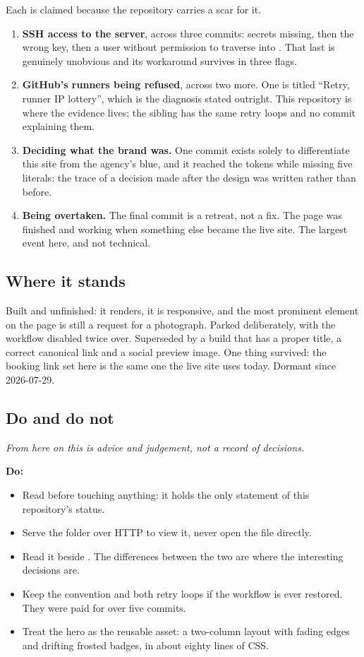 \documentclass[11pt,a4paper]{article}
\begin{document}
Each is claimed because the repository carries a scar for it.

\begin{enumerate}
\item \textbf{SSH access to the server}, across three commits: secrets missing, then
  the wrong key, then a  user without permission to traverse into
  . That last is genuinely unobvious and its workaround survives in
  three  flags.
\item \textbf{GitHub's runners being refused}, across two more. One is titled
  ``Retry, runner IP lottery'', which is the diagnosis stated outright. This
  repository is where the evidence lives; the sibling has the same retry loops and
  no commit explaining them.
\item \textbf{Deciding what the brand was.} One commit exists solely to
  differentiate this site from the agency's blue, and it reached the tokens while
  missing five literals: the trace of a decision made after the design was written
  rather than before.
\item \textbf{Being overtaken.} The final commit is a retreat, not a fix. The page
  was finished and working when something else became the live site. The largest
  event here, and not technical.
\end{enumerate}

\subsection{Where it stands}

Built and unfinished: it renders, it is responsive, and the most prominent element
on the page is still a request for a photograph. Parked deliberately, with the
workflow disabled twice over. Superseded by a build that has a proper title, a
correct canonical link and a social preview image. One thing survived: the booking
link set here is the same one the live site uses today. Dormant since 2026-07-29.

\subsection{Do and do not}

\emph{From here on this is advice and judgement, not a record of decisions.}

\textbf{Do:}
\begin{itemize}
\item Read  before touching anything: it holds the only statement of
  this repository's status.
\item Serve the folder over HTTP to view it, never open the file directly.
\item Read it beside . The differences between the two are where
  the interesting decisions are.
\item Keep the \code{[deploy]} convention and both retry loops if the workflow is
  ever restored. They were paid for over five commits.
\item Treat the hero as the reusable asset: a two-column layout with fading edges
  and drifting frosted badges, in about eighty lines of CSS.
\end{itemize}
\end{document}
